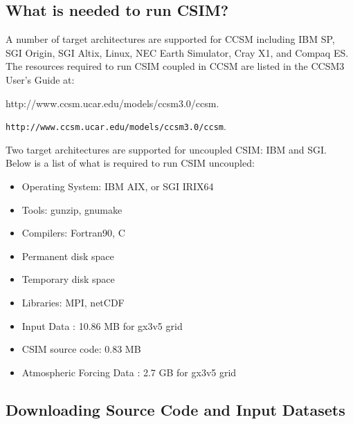 
\subsection{What is needed to run CSIM?}
   
A number of target architectures are supported for CCSM including IBM SP,
SGI Origin, SGI Altix, Linux, NEC Earth Simulator, Cray X1, and Compaq ES.
The resources required to run CSIM coupled in CCSM are listed in the CCSM3
User's Guide at: \\

\begin{htmlonly}
                      {http://www.ccsm.ucar.edu/models/ccsm3.0/ccsm}. \\
\end{htmlonly}
\begin{latexonly}
  {\tt http://www.ccsm.ucar.edu/models/ccsm3.0/ccsm}.
\end{latexonly}

Two target architectures are supported for uncoupled CSIM: IBM and SGI.
Below is a list of what is required to run CSIM uncoupled:

\begin{itemize}

\item Operating System: IBM AIX, or SGI IRIX64
\item Tools: gunzip, gnumake 
\item Compilers: Fortran90, C
\item Permanent disk space
\item Temporary disk space
\item Libraries: MPI, netCDF
\item Input Data  : 10.86 MB for gx3v5 grid
\item CSIM source code: 0.83 MB
\item Atmospheric Forcing Data  : 2.7 GB for gx3v5 grid

\end{itemize}


\subsection{Downloading Source Code and Input Datasets}
  \label{get_code}


